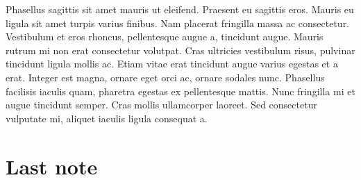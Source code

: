\documentclass{book}
\begin{document}
Phasellus sagittis sit amet mauris ut eleifend. Praesent eu sagittis eros. Mauris eu ligula sit amet turpis varius finibus. Nam placerat fringilla massa ac consectetur. Vestibulum et eros rhoncus, pellentesque augue a, tincidunt augue. Mauris rutrum mi non erat consectetur volutpat. Cras ultricies vestibulum risus, pulvinar tincidunt ligula mollis ac. Etiam vitae erat tincidunt augue varius egestas et a erat. Integer est magna, ornare eget orci ac, ornare sodales nunc. Phasellus facilisis iaculis quam, pharetra egestas ex pellentesque mattis. Nunc fringilla mi et augue tincidunt semper. Cras mollis ullamcorper laoreet. Sed consectetur vulputate mi, aliquet iaculis ligula consequat a.
\backmatter
\chapter{Last note}
\end{document}

